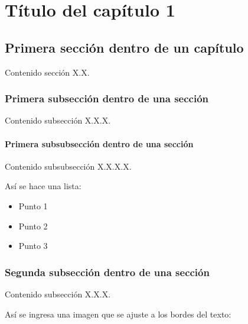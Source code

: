 
\pagestyle{myportland}
\doublespacing
\chapter[----- Título del capítulo 1]{Título del capítulo 1}
\thispagestyle{myportland}



\section{Primera sección dentro de un capítulo}

Contenido sección X.X.

\subsection{Primera subsección dentro de una sección}

Contenido subsección X.X.X.

\subsubsection{Primera subsubsección dentro de una sección}

Contenido subsubsección X.X.X.X.

Así se hace una lista:

\begin{itemize}

	\item Punto 1
	\item Punto 2
	\item Punto 3

\end{itemize}

\subsection{Segunda subsección dentro de una sección}

Contenido subsección X.X.X.

Así se ingresa una imagen que se ajuste a los bordes del texto:

